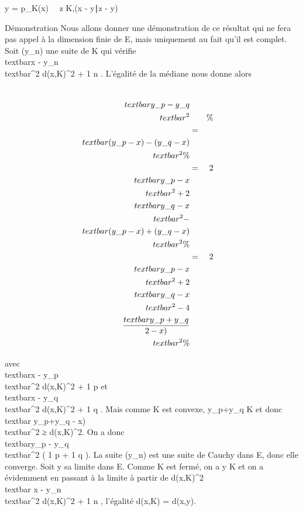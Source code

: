 \documentclass[]{article}
\begin{document}
y = p\_K(x) \Leftrightarrow
\forall~~z \in K,\quad (x -
y∣z - y) 

Démonstration Nous allons donner une démonstration de ce résultat qui ne
fera pas appel à la dimension finie de E, mais uniquement au fait qu'il
est complet. Soit (y\_n) une suite de K qui vérifie
\\textbar{}x -
y\_n\\textbar{}^2 \leq
d(x,K)^2 + 1 \over n . L'égalité de la
médiane nous donne alors

\begin{align*}
\\textbar{}y\_p -
y\_q\\textbar{}^2&& \%&
\\ & =&
\\textbar{}(y\_p - x) - (y\_q -
x)\\textbar{}^2 \%&
\\ & =&
2\\textbar{}y\_p -
x\\textbar{}^2 +
2\\textbar{}y\_ q -
x\\textbar{}^2 -\\textbar{}
(y\_ p - x) + (y\_q -
x)\\textbar{}^2\%&
\\ & =&
2\\textbar{}y\_p -
x\\textbar{}^2 +
2\\textbar{}y\_ q -
x\\textbar{}^2 - 4\\textbar{}
y\_p + y\_q \over 2 -
x)\\textbar{}^2 \%&
\\ \end{align*}

avec \\textbar{}x -
y\_p\\textbar{}^2 \leq
d(x,K)^2 + 1 \over p et
\\textbar{}x -
y\_q\\textbar{}^2 \leq
d(x,K)^2 + 1 \over q . Mais comme K est
convexe,  y\_p+y\_q  \in K et
donc \\textbar{} y\_p+y\_q
 - x)\\textbar{}^2 ≥
d(x,K)^2. On a donc \\textbar{}y\_p -
y\_q\\textbar{}^2 ( 1
\over p + 1 \over q ). La suite
(y\_n) est une suite de Cauchy dans E, donc elle converge. Soit
y sa limite dans E. Comme K est fermé, on a y \in K et on a évidemment en
passant à la limite à partir de d(x,K)^2
\leq\\textbar{} x -
y\_n\\textbar{}^2 \leq
d(x,K)^2 + 1 \over n , l'égalité d(x,K) =
d(x,y).
\end{document}
